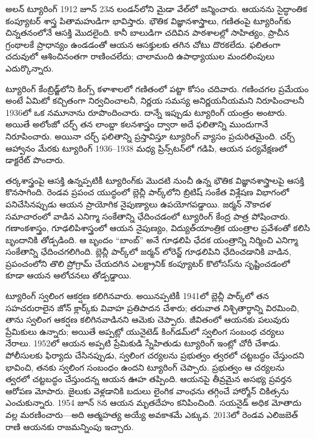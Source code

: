 \documentclass[../../../include/open-logic-section]{subfiles}
\begin{document}


అలన్ ట్యూరింగ్ 1912 జూన్ 23న లండన్‌లోని మైడా వేల్‌లో జన్మించారు. ఆయనను సైద్ధాంతిక కంప్యూటర్ శాస్త్ర పితామహుడిగా భావిస్తారు. భౌతిక విజ్ఞానశాస్త్రాలు, గణితంపై ట్యూరింగ్‌కు చిన్నతనంలోనే ఆసక్తి మొదలైంది. కానీ బాలుడిగా చదివిన పాఠశాలల్లో సాహిత్యం, ప్రాచీన గ్రంథాలకే ప్రాధాన్యం ఉండడంతో ఆయన ఆసక్తులకు తగిన చోటు దొరకలేదు. ఫలితంగా చదువులో ఆశించినంతగా రాణించలేదు; చాలామంది ఉపాధ్యాయుల మందలింపులు ఎదుర్కొన్నారు.


ట్యూరింగ్ కేంబ్రిడ్జ్‌లోని కింగ్స్ కళాశాలలో గణితంలో పట్టా కోసం చదివారు. గణించగల ప్రమేయం అంటే ఏమిటో కచ్చితంగా నిర్వచించాలనీ, నిర్ణయ సమస్య అనిర్ణయనీయమని నిరూపించాలనీ 1936లో ఒక నమూనాను రూపొందించారు. దాన్నే ఇప్పుడు ట్యూరింగ్ యంత్రం అంటారు. అయితే అలోంజో చర్చ్ తన లాంబ్డా కలనశాస్త్రం ద్వారా అదే ఫలితాన్ని ముందుగానే నిరూపించారు. అయినా చర్చ్ ఫలితాన్ని ప్రస్తావిస్తూ ట్యూరింగ్ వ్యాసం ప్రచురితమైంది. చర్చ్ ఆహ్వానం మేరకు ట్యూరింగ్ 1936--1938 మధ్య ప్రిన్స్‌టన్‌లో గడిపి, ఆయన పర్యవేక్షణలో డాక్టరేట్ పొందారు.

తర్కశాస్త్రంపై ఆసక్తి ఉన్నప్పటికీ ట్యూరింగ్‌కు మొదటి నుంచీ ఉన్న భౌతిక విజ్ఞానశాస్త్రాలపై ఆసక్తి కొనసాగింది. రెండవ ప్రపంచ యుద్ధంలో బ్లెచ్లీ పార్క్‌లోని బ్రిటిష్ సంకేత విశ్లేషణ విభాగంలో పనిచేసినప్పుడు ఆయన ప్రాయోగిక నైపుణ్యాలు ఉపయోగపడ్డాయి. జర్మన్ నౌకాదళ సమాచారంలో వాడిన ఎనిగ్మా సంకేతాన్ని ఛేదించడంలో ట్యూరింగ్ కేంద్ర పాత్ర పోషించారు. గణాంకశాస్త్రం, గూఢలిపిశాస్త్రంలో ఆయన నైపుణ్యం, విద్యుత్‌యాంత్రిక యంత్రాల ప్రవేశంతో కలిసి బృందానికి తోడ్పడింది. ఆ బృందం ``బాంబ్'' అనే గూఢలిపి ఛేదక యంత్రాన్ని నిర్మించి ఎనిగ్మా సంకేతాన్ని ఛేదించగలిగింది. బ్లెచ్లీ పార్క్‌లో జర్మన్ లోరెన్జ్ గూఢలిపిని ఛేదించడానికి వాడిన, ప్రపంచంలోని తొలి ప్రోగ్రామ్ చేయదగిన ఎలక్ట్రానిక్ కంప్యూటర్ కొలోసస్‌ను సృష్టించడంలో కూడా ఆయన ఆలోచనలు తోడ్పడ్డాయి.

ట్యూరింగ్ స్వలింగ ఆకర్షణ కలిగినవారు. అయినప్పటికీ 1941లో బ్లెచ్లీ పార్క్‌లో తన సహచరురాలైన జోన్ క్లార్క్‌కు వివాహ ప్రతిపాదన చేశారు; తరువాత నిశ్చితార్థాన్ని విరమించి, తాను స్వలింగ ఆకర్షణ కలిగినవాడినని ఆమెకు చెప్పారు. జీవితంలో ఆయనకు పలువురు ప్రేమికులు ఉన్నారు; అయితే అప్పట్లో యునైటెడ్ కింగ్‌డమ్‌లో స్వలింగ సంబంధ చర్యలు నేరాలు. 1952లో ఆయన అప్పటి ప్రేమికుడి స్నేహితుడు ట్యూరింగ్ ఇంట్లో చోరీ చేశాడు. పోలీసులకు ఫిర్యాదు చేసినప్పుడు, స్వలింగ చర్యలను ప్రభుత్వం త్వరలో చట్టబద్ధం చేస్తుందని భావించి, తనకు స్వలింగ సంబంధం ఉందని ట్యూరింగ్ చెప్పారు. ప్రభుత్వం ఆ చర్యలను త్వరలో చట్టబద్ధం చేస్తుందన్న ఆయన ఊహ తప్పింది. ఆయనపై తీవ్రమైన అసభ్య ప్రవర్తన ఆరోపణ మోపారు. జైలుకు వెళ్లడానికి బదులు లైంగిక వాంఛను తగ్గించే హార్మోన్ చికిత్సను ఎంచుకున్నారు. 1954 జూన్ 8న ఆయన మృతదేహం కనిపించింది. సయనైడ్ అధిక మోతాదు వల్ల మరణించారు---అది ఆత్మహత్య అయ్యే అవకాశమే ఎక్కువ. 2013లో రెండవ ఎలిజబెత్ రాణి ఆయనకు రాజమన్నింపు ఇచ్చారు.
\end{document}
